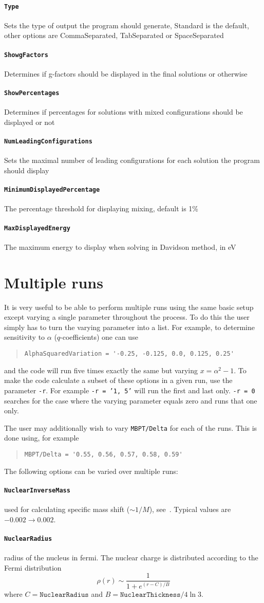 \documentclass[a4paper,11pt]{article}
\newcommand{\option}[1]{\paragraph{\texttt{#1}}}
\begin{document}
\option{Type} Sets the type of output the program should generate, Standard is the default, other options are CommaSeparated, TabSeparated or SpaceSeparated
\option{ShowgFactors} Determines if g-factors should be displayed in the final solutions or otherwise
\option{ShowPercentages} Determines if percentages for solutions with mixed configurations should be displayed or not
\option{NumLeadingConfigurations} Sets the maximal number of leading configurations for each solution the program should display
\option{MinimumDisplayedPercentage} The percentage threshold for displaying mixing, default is 1\%
\option{MaxDisplayedEnergy} The maximum energy to display when solving in Davidson method, in eV

\section{Multiple runs}

It is very useful to be able to perform multiple runs using the same basic setup except varying a single parameter throughout the process. To do this the user simply has to turn the varying parameter into a list. For example, to determine sensitivity to $\alpha$ ($q$-coefficients) one can use
\begin{quote}
\begin{verbatim}
AlphaSquaredVariation = '-0.25, -0.125, 0.0, 0.125, 0.25'
\end{verbatim}
\end{quote}
and the code will run five times exactly the same but varying $x = \alpha^2 - 1$. To make the code calculate a subset of these options in a given run, use the parameter \texttt{-r}. For example \texttt{-r = '1, 5'} will run the first and last only. \texttt{-r = 0} searches for the case where the varying parameter equals zero and runs that one only.

The user may additionally wish to vary \texttt{MBPT/Delta} for each of the runs. This is done using, for example
\begin{quote}
\begin{verbatim}
MBPT/Delta = '0.55, 0.56, 0.57, 0.58, 0.59'
\end{verbatim}
\end{quote}

The following options can be varied over multiple runs:
\option{NuclearInverseMass} used for calculating specific mass shift ($\sim 1/M$), see~\cite{berengut03pra,berengut05pra,berengut06pra}. Typical values are $-0.002 \rightarrow 0.002$.
\option{NuclearRadius} radius of the nucleus in fermi. The nuclear charge is distributed according to the Fermi distribution
\[
\rho(r) \sim \frac{1}{1 + e^{(r - C)/B}}
\]
where $C = \texttt{NuclearRadius}$ and $B = \texttt{NuclearThickness}/4\ln 3$.
\end{document}

